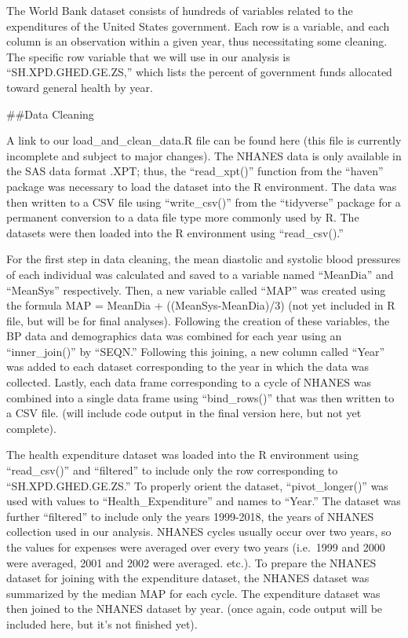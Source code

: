 \documentclass[
]{article}
\begin{document}
The World Bank dataset consists of hundreds of variables related to the
expenditures of the United States government. Each row is a variable,
and each column is an observation within a given year, thus
necessitating some cleaning. The specific row variable that we will use
in our analysis is ``SH.XPD.GHED.GE.ZS,'' which lists the percent of
government funds allocated toward general health by year.

\#\#Data Cleaning

A link to our load\_and\_clean\_data.R file can be found here (this file
is currently incomplete and subject to major changes). The NHANES data
is only available in the SAS data format .XPT; thus, the ``read\_xpt()''
function from the ``haven'' package was necessary to load the dataset
into the R environment. The data was then written to a CSV file using
``write\_csv()'' from the ``tidyverse'' package for a permanent
conversion to a data file type more commonly used by R. The datasets
were then loaded into the R environment using ``read\_csv().''

For the first step in data cleaning, the mean diastolic and systolic
blood pressures of each individual was calculated and saved to a
variable named ``MeanDia'' and ``MeanSys'' respectively. Then, a new
variable called ``MAP'' was created using the formula MAP = MeanDia +
((MeanSys-MeanDia)/3) (not yet included in R file, but will be for final
analyses). Following the creation of these variables, the BP data and
demographics data was combined for each year using an ``inner\_join()''
by ``SEQN.'' Following this joining, a new column called ``Year'' was
added to each dataset corresponding to the year in which the data was
collected. Lastly, each data frame corresponding to a cycle of NHANES
was combined into a single data frame using ``bind\_rows()'' that was
then written to a CSV file. (will include code output in the final
version here, but not yet complete).

The health expenditure dataset was loaded into the R environment using
``read\_csv()'' and ``filtered'' to include only the row corresponding
to ``SH.XPD.GHED.GE.ZS.'' To properly orient the dataset,
``pivot\_longer()'' was used with values to ``Health\_Expenditure'' and
names to ``Year.'' The dataset was further ``filtered'' to include only
the years 1999-2018, the years of NHANES collection used in our
analysis. NHANES cycles usually occur over two years, so the values for
expenses were averaged over every two years (i.e.~1999 and 2000 were
averaged, 2001 and 2002 were averaged. etc.). To prepare the NHANES
dataset for joining with the expenditure dataset, the NHANES dataset was
summarized by the median MAP for each cycle. The expenditure dataset was
then joined to the NHANES dataset by year. (once again, code output will
be included here, but it's not finished yet).
\end{document}
